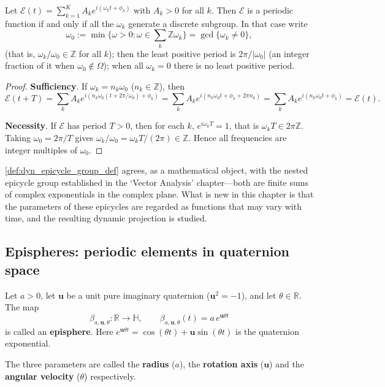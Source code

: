 \begin{proposition}\label{prop:dyn_epicycle_period_condition}
Let $\mathcal E(t)=\sum_{k=1}^{K}A_k e^{i(\omega_k t+\phi_k)}$ with $A_k>0$ for all $k$. Then $\mathcal E$ is a periodic function if and only if all the $\omega_k$ generate a discrete subgroup. In that case write
\[
\omega_0:=\min\{\omega>0:\omega\in\textstyle\sum_k\mathbb{Z}\omega_k\}=\gcd\{\omega_k\ne0\},
\]
(that is, $\omega_k/\omega_0\in\mathbb Z$ for all $k$); then the least positive period is $2\pi/\lvert\omega_0\rvert$ (an integer fraction of it when $\omega_0\notin\Omega$); when all $\omega_k=0$ there is no least positive period.
\end{proposition}

\begin{proof}
\textbf{Sufficiency}. If $\omega_k=n_k\omega_0$ ($n_k\in\mathbb Z$), then
\[
\mathcal E(t+T)=\sum_k A_k e^{i(n_k\omega_0(t+2\pi/\omega_0)+\phi_k)}
=\sum_k A_k e^{i(n_k\omega_0 t+\phi_k+2\pi n_k)}
=\sum_k A_k e^{i(n_k\omega_0 t+\phi_k)}=\mathcal E(t).
\]

\textbf{Necessity}. If $\mathcal E$ has period $T>0$, then for each $k$, $e^{i\omega_k T}=1$, that is $\omega_k T\in 2\pi\mathbb Z$. Taking $\omega_0=2\pi/T$ gives $\omega_k/\omega_0=\omega_k T/(2\pi)\in\mathbb Z$. Hence all frequencies are integer multiples of $\omega_0$.
\end{proof}

\begin{remark}\label{rem:dyn_epicycle_static_link}
\cref{def:dyn_epicycle_group_def} agrees, as a mathematical object, with the nested epicycle group established in the `Vector Analysis' chapter---both are finite sums of complex exponentials in the complex plane. What is new in this chapter is that the parameters of these epicycles are regarded as functions that may vary with time, and the resulting dynamic projection is studied.
\end{remark}

\subsection{Epispheres: periodic elements in quaternion space}

\begin{definition}[Episphere]\label{def:dyn_epicycle_ball}
Let $a>0$, let $\mathbf u$ be a unit pure imaginary quaternion ($\mathbf u^2=-1$), and let $\theta\in\mathbb R$. The map
\[
\beta_{a,\mathbf u,\theta}:\mathbb R\to\mathbb H,\qquad
\beta_{a,\mathbf u,\theta}(t)=a\,e^{\mathbf u\theta t}
\]
is called an \textbf{episphere}. Here $e^{\mathbf u\theta t}=\cos(\theta t)+\mathbf u\sin(\theta t)$ is the quaternion exponential.

The three parameters are called the \textbf{radius} ($a$), the \textbf{rotation axis} ($\mathbf u$) and the \textbf{angular velocity} ($\theta$) respectively.
\end{definition}

